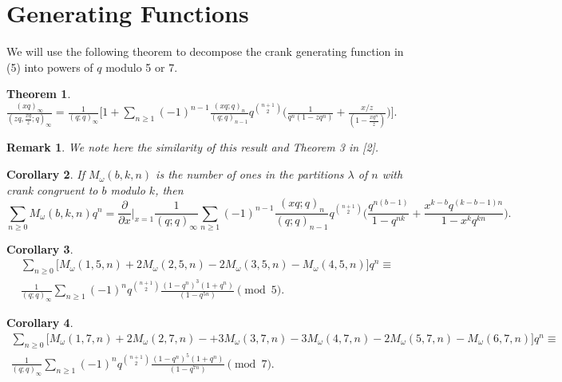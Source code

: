 \documentclass[10pt,reqno]{amsart}
\newtheorem{theorem}{Theorem}[section]
\newtheorem{corollary}[theorem]{Corollary}
\newtheorem{remark}[]{Remark}
\begin{document}
\section{Generating Functions}
We will use the following theorem to decompose the crank generating function in (5) into powers of $q$ modulo 5 or 7. 
\begin{theorem}
$\displaystyle\frac{(xq)_{\infty}}{(zq,\displaystyle\frac{xq}{z};q)_{\infty}}=\displaystyle\frac{1}{(q;q)_{\infty}}\bigg[1+\displaystyle\sum_{n\geq 1}(-1)^{n-1}\displaystyle\frac{(xq;q)_n}{(q;q)_{n-1}}q^{\binom{n+1}{2}}\bigg(\displaystyle\frac{1}{q^n(1-zq^n)}+\displaystyle\frac{x/z}{(1-\displaystyle\frac{xq^n}{z})}\bigg)\bigg].$
\end{theorem}
\begin{remark}
We note here the similarity of this result and Theorem 3 in [2].
\end{remark}
\begin{corollary}
If $M_{\omega}(b,k,n)$ is the number of ones in the partitions $\lambda$ of $n$ with crank congruent to $b$ modulo $k$, then 
\begin{equation*}
    \displaystyle\sum_{n\geq 0}M_{\omega}(b,k,n)q^n=\frac{\partial}{\partial x}\Bigr\rvert_{x = 1}\displaystyle\frac{1}{(q;q)_{\infty}}\displaystyle\sum_{n\geq 1}(-1)^{n-1}\displaystyle\frac{(xq;q)_n}{(q;q)_{n-1}}q^{\binom{n+1}{2}}\bigg(\displaystyle\frac{q^{n(b-1)}}{1-q^{nk}}+\displaystyle\frac{x^{k-b}q^{(k-b-1)n}}{1-x^kq^{kn}}\bigg).
\end{equation*}
\end{corollary}
\begin{corollary}
\begin{equation*}
\begin{split}
\displaystyle\sum_{n\geq 0}\bigg[M_{\omega}(1,5,n)+2M_{\omega}(2,5,n)-2M_{\omega}(3,5,n)-M_{\omega}(4,5,n)\bigg]q^n\equiv \\ \displaystyle\frac{1}{(q;q)_{\infty}}\displaystyle\sum_{n\geq 1}(-1)^nq^{\binom{n+1}{2}}\displaystyle\frac{(1-q^n)^3(1+q^n)}{(1-q^{5n})}\pmod 5.
\end{split}
\end{equation*}
\end{corollary}
\begin{corollary}
\begin{equation*}
\begin{split}
\displaystyle\sum_{n\geq 0}\bigg[M_{\omega}(1,7,n)+2M_{\omega}(2,7,n)-+3M_{\omega}(3,7,n)-3M_{\omega}(4,7,n)-2M_{\omega}(5,7,n)-M_{\omega}(6,7,n)\bigg]q^n\equiv \\ \displaystyle\frac{1}{(q;q)_{\infty}}\displaystyle\sum_{n\geq 1}(-1)^nq^{\binom{n+1}{2}}\displaystyle\frac{(1-q^n)^5(1+q^n)}{(1-q^{7n})}\pmod 7.
\end{split}
\end{equation*}
\end{corollary}
\end{document}
